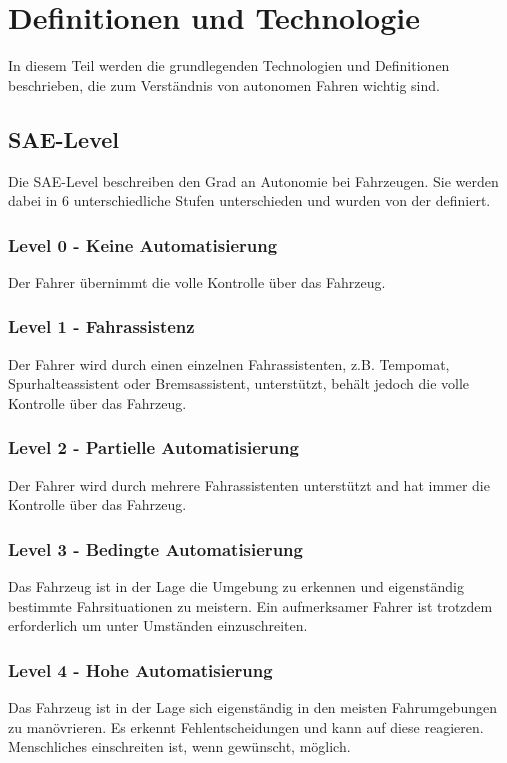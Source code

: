 

\section{Definitionen und Technologie}
\label{sec:definitionen-und-technologie}

In diesem Teil werden die grundlegenden Technologien und Definitionen beschrieben, die zum Verständnis von autonomen Fahren wichtig sind.

\subsection{SAE-Level}
\label{ssec:sae-level}

Die SAE-Level \cite{standardSAE} beschreiben den Grad an Autonomie bei Fahrzeugen. Sie werden dabei in 6 unterschiedliche Stufen unterschieden und wurden von der \citeauthor{standardSAE} definiert.\\

\subsubsection*{Level 0 - Keine Automatisierung} Der Fahrer übernimmt die volle Kontrolle über das Fahrzeug.

\subsubsection*{Level 1 - Fahrassistenz} Der Fahrer wird durch einen einzelnen Fahrassistenten, z.B. Tempomat, Spurhalteassistent oder Bremsassistent, unterstützt, behält jedoch die volle Kontrolle über das Fahrzeug.

\subsubsection*{Level 2 - Partielle Automatisierung} Der Fahrer wird durch mehrere Fahrassistenten unterstützt and hat immer die Kontrolle über das Fahrzeug.
    
\subsubsection*{Level 3 - Bedingte Automatisierung} Das Fahrzeug ist in der Lage die Umgebung zu erkennen und eigenständig bestimmte Fahrsituationen zu meistern. Ein aufmerksamer Fahrer ist trotzdem erforderlich um unter Umständen einzuschreiten.

\subsubsection*{Level 4 - Hohe Automatisierung} Das Fahrzeug ist in der Lage sich eigenständig in den meisten Fahrumgebungen zu manövrieren. Es erkennt Fehlentscheidungen und kann auf diese reagieren. Menschliches einschreiten ist, wenn gewünscht, möglich.

